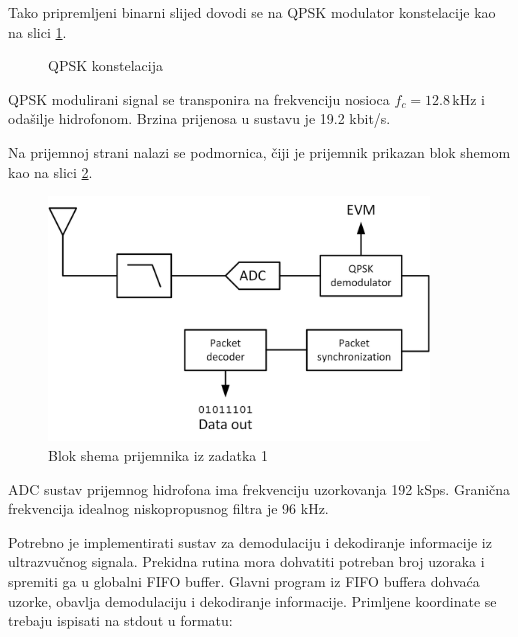 \documentclass[a4paper]{article}
\begin{document}
Tako pripremljeni binarni slijed dovodi se na QPSK modulator konstelacije kao na slici \ref{fig:qpsk}.

\begin{figure}[h!]
\centering
{}
\caption{QPSK konstelacija}
\label{fig:qpsk}
\end{figure}

QPSK modulirani signal se transponira na frekvenciju nosioca $f_c = 12.8 \,\textrm{kHz}$ i odašilje hidrofonom. Brzina prijenosa u sustavu je 19.2 kbit/s.

Na prijemnoj strani nalazi se podmornica, čiji je prijemnik prikazan blok shemom kao na slici \ref{fig:task1}.

\begin{figure}[h!]
\centering
\includegraphics[width=0.9\textwidth]{Task1.png}
\caption{Blok shema prijemnika iz zadatka 1}
\label{fig:task1}
\end{figure}

ADC sustav prijemnog hidrofona ima frekvenciju uzorkovanja 192 kSps. Granična frekvencija idealnog niskopropusnog filtra je 96 kHz.

Potrebno je implementirati sustav za demodulaciju i dekodiranje informacije iz ultrazvučnog signala. Prekidna rutina mora dohvatiti potreban broj uzoraka i spremiti ga u globalni FIFO buffer. Glavni program iz FIFO buffera dohvaća uzorke, obavlja demodulaciju i dekodiranje informacije. Primljene koordinate se trebaju ispisati na stdout u formatu:
\end{document}
